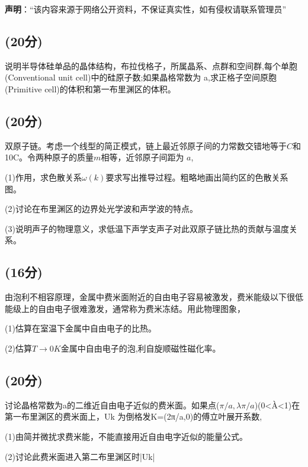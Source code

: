 
\textbf{声明}：“该内容来源于网络公开资料，不保证真实性，如有侵权请联系管理员”


\subsection{(20分)}
说明半导体硅单品的晶体结构，布拉伐格子，所属晶系、点群和空间群,每个单胞(Conventional unit cell)中的硅原子数;如果晶格常数为 a,求正格子空间原胞(Primitive cell)的体积和第一布里渊区的体积。
\subsection{(20分)}
双原子链。考虑一个线型的简正模式，链上最近邻原子间的力常数交错地等于$C$和 10C。令两种原子的质量$m$相等，近邻原子间距为 $a$,

(1)作用，求色散关系$\omega(k)$要求写出推导过程。粗略地画出简约区的色散关系图。

(2)讨论在布里渊区的边界处光学波和声学波的特点。

(3)说明声子的物理意义，求低温下声学支声子对此双原子链比热的贡献与温度关系。
\subsection{(16分)}
由泡利不相容原理，金属中费米面附近的自由电子容易被激发，费米能级以下很低能级上的自由电子很难激发，通常称为费米冻结。用此物理图象，

(1)估算在室温下金属中自由电子的比热。

(2)估算$T\to 0K$金属中自由电子的泡,利自旋顺磁性磁化率。
\subsection{(20分)}
讨论晶格常数为a的二维近自由电子近似的费米面。如果点($\pi/a,\lambda \pi/a$)(0<À<1)在第一布里渊区的费米面上，Uk 为倒格发K=(2π/a,0)的傅立叶展开系数,

(1)由简并微扰求费米能，不能直接用近自由电字近似的能量公式。

(2)讨论此费米面进入第二布里渊区时|Uk|